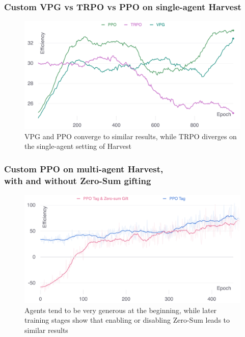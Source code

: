 \documentclass{beamer}
\begin{document}
\begin{frame}
	\frametitle{Custom VPG vs TRPO vs PPO on single-agent Harvest}
	\begin{figure}
		\centering
		\includegraphics[width=0.9\linewidth]{../assets/vpg-trpo-ppo-single-efficiency.png}
		\caption*{VPG and PPO converge to similar results, while TRPO diverges on the single-agent setting of Harvest}
	\end{figure} 
\end{frame}

\begin{frame}
	\frametitle{Custom PPO on multi-agent Harvest, \\with and without Zero-Sum gifting}
	\begin{figure}
		\centering
		\includegraphics[width=0.9\linewidth]{../assets/ppo-tag-gift-vs-nogift-efficiency.png}
		\caption*{Agents tend to be very generous at the beginning, while later training stages show that enabling or disabling Zero-Sum leads to similar results}
	\end{figure}
\end{frame}
\end{document}
